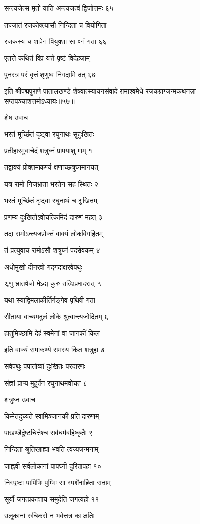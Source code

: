 सन्त्यजेत्स मृतो याति अन्त्यजत्वं द्विजोत्तमः ६५

तज्जातं रजकोक्त्यासौ निन्दिता च वियोगिता

रजकस्य च शापेन वियुक्ता सा वनं गता ६६

एतत्ते कथितं विप्र यत्ते पृष्टं विदेहजाम्

पुनरत्र परं वृत्तं शृणुष्व निगदामि तत् ६७


इति श्रीपद्मपुराणे पातालखण्डे शेषवात्स्यायनसंवादे रामाश्वमेधे रजकप्राग्जन्मकथनन्ना सप्तपञ्चाशत्तमोऽध्यायः॥५७॥


शेष उवाच

भरतं मूर्च्छितं दृष्ट्वा रघुनाथः सुदुःखितः

प्रतीहारमुवाचेदं शत्रुघ्नं प्रापयाशु माम् १

तद्वाक्यं प्रोक्तमाकर्ण्य क्षणाच्छत्रुघ्नमानयत्

यत्र रामो निजभ्राता भरतेन सह स्थितः २

भरतं मूर्च्छितं दृष्ट्वा रघुनाथं च दुःखितम्

प्रणम्य दुःखितोऽवोचत्किमिदं दारुणं महत् ३

तदा रामोऽन्त्यजप्रोक्तं वाक्यं लोकविगर्हितम्

तं प्रत्युवाच रामोऽसौ शत्रुघ्नं पदसेवकम् ४

अधोमुखो दीनरवो गद्गदाक्षरवेपथुः

शृणु भ्रातर्वचो मेऽद्य कुरु तत्क्षिप्रमादरात् ५

यथा स्याद्विमलाकीर्तिर्गङ्गेव पृथिवीं गता

सीताया वाच्यमतुलं लोके श्रुत्वान्त्यजोदितम् ६

हातुमिच्छामि देहं स्वमेनां वा जानकीं किल

इति वाक्यं समाकर्ण्य रामस्य किल शत्रुहा ७

सवेपथुः पपातोर्व्यां दुःखितः परदारणः

संज्ञां प्राप्य मुहूर्तेन रघुनाथमवोचत ८

शत्रुघ्न उवाच

किमेतदुच्यते स्वामिञ्जानकीं प्रति दारुणम्

पाखण्डैर्दुष्टचित्तैश्च सर्वधर्मबहिष्कृतैः ९

निन्दिता श्रुतिरग्राह्या भवति त्वग्र्यजन्मनाम्

जाह्नवी सर्वलोकानां पापघ्नी दुरितापहा १०

निस्पृष्टा पापिभिः पुम्भिः सा स्पर्शेनार्हिता सताम्

सूर्यो जगत्प्रकाशाय समुदेति जगत्यहो ११

उलूकानां रुचिकरो न भवेत्तत्र का क्षतिः

